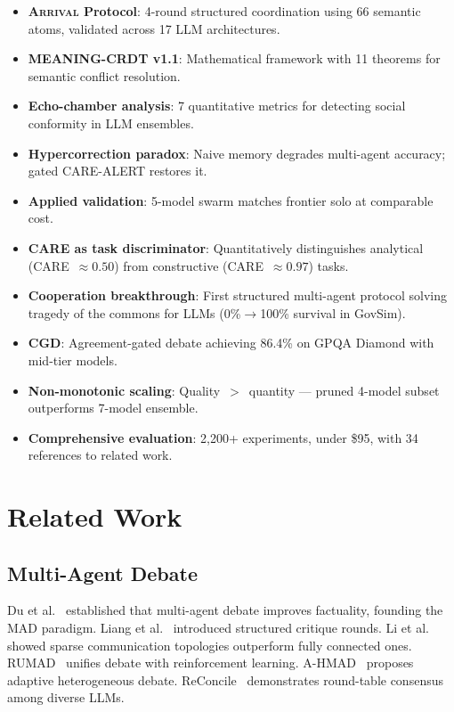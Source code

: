 \documentclass[11pt,a4paper]{article}
\newcommand{\arrival}{\textsc{Arrival}\xspace}
\begin{document}
\begin{itemize}
  \item \textbf{\arrival Protocol}: 4-round structured coordination
    using 66 semantic atoms, validated across 17 LLM architectures.
  \item \textbf{MEANING-CRDT v1.1}: Mathematical framework with
    11 theorems for semantic conflict resolution.
  \item \textbf{Echo-chamber analysis}: 7 quantitative metrics for
    detecting social conformity in LLM ensembles.
  \item \textbf{Hypercorrection paradox}: Naive memory degrades
    multi-agent accuracy; gated CARE-ALERT restores it.
  \item \textbf{Applied validation}: 5-model swarm matches frontier
    solo at comparable cost.
  \item \textbf{CARE as task discriminator}: Quantitatively
    distinguishes analytical (CARE~$\approx0.50$) from constructive
    (CARE~$\approx0.97$) tasks.
  \item \textbf{Cooperation breakthrough}: First structured
    multi-agent protocol solving tragedy of the commons for LLMs
    (0\%$\to$100\% survival in GovSim).
  \item \textbf{CGD}: Agreement-gated debate achieving 86.4\% on GPQA
    Diamond with mid-tier models.
  \item \textbf{Non-monotonic scaling}: Quality~$>$~quantity —
    pruned 4-model subset outperforms 7-model ensemble.
  \item \textbf{Comprehensive evaluation}: 2,200+ experiments, under
    \$95, with 34 references to related work.
\end{itemize}

\section{Related Work}\label{sec:related}

\subsection{Multi-Agent Debate}

Du et al.~\cite{du2024debate} established that multi-agent debate
improves factuality, founding the MAD paradigm.  Liang et
al.~\cite{liang2024divergent} introduced structured critique rounds.
Li et al.~\cite{li2024sparse} showed sparse communication topologies
outperform fully connected ones.  RUMAD~\cite{wang2026rumad} unifies
debate with reinforcement learning.  A-HMAD~\cite{zhou2025ahmad}
proposes adaptive heterogeneous debate.  ReConcile~\cite{chen2024reconcile}
demonstrates round-table consensus among diverse LLMs.
\end{document}
